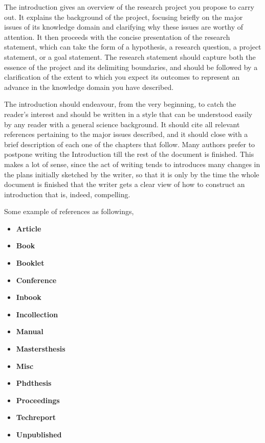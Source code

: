 The introduction gives an overview of the research project you propose to carry out. It explains the background of the project, focusing briefly on the major issues of its knowledge domain and clarifying why these issues are worthy of attention. It then proceeds with the concise presentation of the research statement, which can take the form of a hypothesis, a research question, a project statement, or a goal statement. The research statement should capture both the essence of the project and its delimiting boundaries, and should be followed by a clarification of the extent to which you expect its outcomes to represent an advance in the knowledge domain you have described.

The introduction should endeavour, from the very beginning, to catch the reader’s interest and should be written in a style that can be understood easily by any reader with a general science background. It should cite all relevant references pertaining to the major issues described, and it should close with a brief description of each one of the chapters that follow. Many authors prefer to postpone writing the Introduction till the rest of the document is finished. This makes a lot of sense, since the act of writing tends to introduces many changes in the plans initially sketched by the writer, so that it is only by the time the whole document is finished that the writer gets a clear view of how to construct an introduction that is, indeed, compelling.

Some example of references as followings,

\begin{multicols}{2}

\begin{itemize}
    
    \item   \textbf{Article}\cite{article}
    \item   \textbf{Book}\cite{book}
    \item   \textbf{Booklet}\cite{booklet}
    \item   \textbf{Conference}\cite{conference}
    \item   \textbf{Inbook}\cite{inbook}
    \item   \textbf{Incollection}\cite{incollection}
    \item   \textbf{Manual}\cite{manual}
    \item   \textbf{Mastersthesis}\cite{mastersthesis}
    \item   \textbf{Misc}\cite{misc}
    \item   \textbf{Phdthesis}\cite{phdthesis}
    \item   \textbf{Proceedings}\cite{proceedings}
    \item   \textbf{Techreport}\cite{techreport}
    \item   \textbf{Unpublished}\cite{unpublished}

\end{itemize}

\end{multicols}